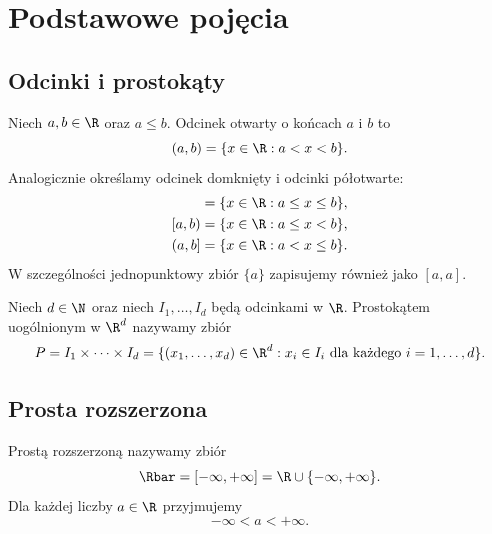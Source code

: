 \chapter{Podstawowe pojęcia}
\label{chap:podstawowe-pojecia}

\section{Odcinki i prostokąty}
\label{sec:terminologia}

\begin{definicja}[Odcinki]
Niech $a,b\in\R$ oraz $a\leq b$. Odcinek otwarty o końcach $a$ i $b$ to
\begin{equation}
  (a,b)=\{x\in\R:a<x<b\}.
  \label{eq:odcinek-otwarty}
\end{equation}
Analogicznie określamy odcinek domknięty i odcinki półotwarte:
\begin{align*}
  [a,b]&=\{x\in\R:a\leq x\leq b\},\\
  [a,b)&=\{x\in\R:a\leq x<b\},\\
  (a,b]&=\{x\in\R:a<x\leq b\}.
\end{align*}
W szczególności jednopunktowy zbiór $\{a\}$ zapisujemy również jako $[a,a]$.
\end{definicja}

\begin{definicja}
Niech $d\in\N$ oraz niech $I_1,\ldots,I_d$ będą odcinkami w $\R$.
Prostokątem uogólnionym w $\R^d$ nazywamy zbiór
\begin{equation}
  P=I_1\times\cdots\times I_d
   =\{(x_1,\ldots,x_d)\in\R^d:
       x_i\in I_i\text{ dla każdego }i=1,\ldots,d\}.
  \label{eq:prostokat}
\end{equation}
\end{definicja}

\section{Prosta rozszerzona}
\label{sec:prosta-rozszerzona}

\begin{definicja}
Prostą rozszerzoną nazywamy zbiór
\begin{equation}
  \Rbar=[-\infty,+\infty]=\R\cup\{-\infty,+\infty\}.
  \label{eq:prosta-rozszerzona}
\end{equation}
Dla każdej liczby $a\in\R$ przyjmujemy
\[
  -\infty<a<+\infty.
\]
\end{definicja}

